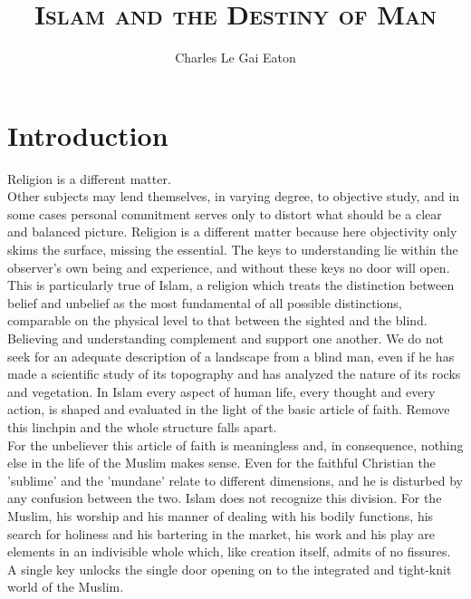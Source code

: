 \documentclass[11pt, b5paper, twoside]{book}
\title{\LARGE \textbf{\textsc{Islam and the Destiny of Man}}}
\author{\Large Charles Le Gai Eaton}
\date{ }
\begin{document}

\maketitle
\tableofcontents

\frontmatter
{}

\chapter{Introduction}

Religion is a different matter.\\

Other subjects may lend themselves, in varying degree, to objective study, and in some cases personal commitment serves only to distort what should be a clear and balanced picture. Religion is a different matter because here objectivity only skims the surface, missing the essential. The keys to understanding lie within the observer's own being and experience, and without these keys no door will open. This is particularly true of Islam, a religion which treats the distinction between belief and unbelief as the most fundamental of all possible distinctions, comparable on the physical level to that between the sighted and the blind. Believing and understanding complement and support one another. We do not seek for an adequate description of a landscape from a blind man, even if he has made a scientific study of its topography and has analyzed the nature of its rocks and vegetation. In Islam every aspect of human life, every thought and every action, is shaped and evaluated in the light of the basic article of faith. Remove this linchpin and the whole structure falls apart.\\

For the unbeliever this article of faith is meaningless and, in consequence, nothing else in the life of the Muslim makes sense. Even for the faithful Christian the 'sublime' and the 'mundane' relate to different dimensions, and he is disturbed by any confusion between the two. Islam does not recognize this division. For the Muslim, his worship and his manner of dealing with his bodily functions, his search for holiness and his bartering in the market, his work and his play are elements in an indivisible whole which, like creation itself, admits of no fissures. A single key unlocks the single door opening on to the integrated and tight-knit world of the Muslim.\\
\end{document}
